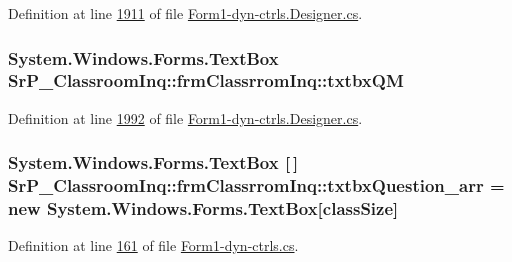 \-Definition at line \hyperlink{_form1-dyn-ctrls_8_designer_8cs_source_l01911}{1911} of file \hyperlink{_form1-dyn-ctrls_8_designer_8cs_source}{\-Form1-\/dyn-\/ctrls.\-Designer.\-cs}.

\hypertarget{class_sr_p___classroom_inq_1_1frm_classrrom_inq_a4a85095c6aa75b21689e40d7dc78ace6}{
\subsubsection[{txtbx\-Q\-M}]{\setlength{\rightskip}{0pt plus 5cm}\-System.\-Windows.\-Forms.\-Text\-Box {\bf \-Sr\-P\-\_\-\-Classroom\-Inq\-::frm\-Classrrom\-Inq\-::txtbx\-Q\-M}}}
\label{class_sr_p___classroom_inq_1_1frm_classrrom_inq_a4a85095c6aa75b21689e40d7dc78ace6}


\-Definition at line \hyperlink{_form1-dyn-ctrls_8_designer_8cs_source_l01992}{1992} of file \hyperlink{_form1-dyn-ctrls_8_designer_8cs_source}{\-Form1-\/dyn-\/ctrls.\-Designer.\-cs}.

\hypertarget{class_sr_p___classroom_inq_1_1frm_classrrom_inq_ac8b5f7f10341c6c43066881afcbbcaaa}{
\subsubsection[{txtbx\-Question\-\_\-arr}]{\setlength{\rightskip}{0pt plus 5cm}\-System.\-Windows.\-Forms.\-Text\-Box \mbox{[}$\,$\mbox{]} {\bf \-Sr\-P\-\_\-\-Classroom\-Inq\-::frm\-Classrrom\-Inq\-::txtbx\-Question\-\_\-arr} = new \-System.\-Windows.\-Forms.\-Text\-Box\mbox{[}{\bf class\-Size}\mbox{]}}}
\label{class_sr_p___classroom_inq_1_1frm_classrrom_inq_ac8b5f7f10341c6c43066881afcbbcaaa}


\-Definition at line \hyperlink{_form1-dyn-ctrls_8cs_source_l00161}{161} of file \hyperlink{_form1-dyn-ctrls_8cs_source}{\-Form1-\/dyn-\/ctrls.\-cs}.

